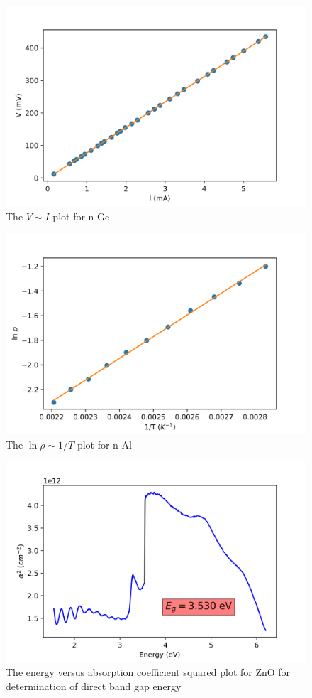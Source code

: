 \documentclass[%
 aip,
 amsmath,amssymb,
 reprint,%
]{revtex4-1}
\begin{document}
\begin{figure}
    \centering
    \includegraphics[scale = 0.56]{Figures/plot-n-Ge.png}
    \caption{The $V \sim I$ plot for n-Ge}
    \label{fig:geplot}
\end{figure}
\begin{figure}
    \centering
    \includegraphics[scale = 0.56]{Figures/plot-temp.png}
    \caption{The $\ln \rho \sim 1/T$ plot for n-Al}
    \label{fig:tempplot}
\end{figure}
\begin{figure}
    \centering
    \includegraphics[scale = 0.56]{Figures/plot-1b-ZnO.png}
    \caption{The energy versus absorption coefficient squared plot for ZnO for determination of direct band gap energy}
    \label{fig:znoplot}
\end{figure}
\end{document}
